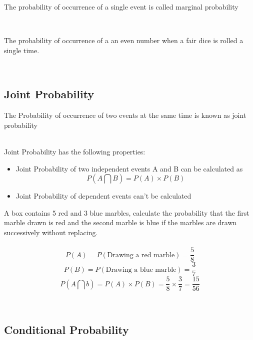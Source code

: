 \documentclass[twoside,12pt]{report}  %
\begin{document}
\begin{tcolorbox}[colback=red!5!white, colframe=red!75!black, title = \textbf{Marginal Probability}]
	The probability of occurrence of a single event is called marginal probability
\end{tcolorbox}
\noindent
\\
\begin{tcolorbox}[colback=blue!5!white, colframe=blue!75!black, title = \textbf{Marginal Probability}]
	The probability of occurrence of a an even number when a fair dice is rolled a single time.
\end{tcolorbox}
\noindent
\\
\subsection{Joint Probability}

\begin{tcolorbox}[colback=red!5!white, colframe=red!75!black, title = \textbf{Joint Probability}]
	The Probability of occurrence of two events at the same time is known as joint probability
\end{tcolorbox}
\noindent
\\
Joint Probability has the following properties:
\begin{itemize}
	\item Joint Probability of two independent events A and B can be calculated as
	$$ P(A \bigcap B) = P(A) \times P(B)$$
	\item Joint Probability of dependent events can't be calculated
\end{itemize}

\begin{tcolorbox}[colback=blue!5!white, colframe=blue!75!black, title = \textbf{Joint Probability}]
	A box contains 5 red and 3 blue marbles, calculate the probability that the first marble drawn is red and the second marble is blue if the marbles are drawn successively without replacing.
	\\
	\\
	 $$ P(A) = P(\mbox{Drawing a red marble}) = \frac{5}{8}$$
	 $$ P(B) = P(\mbox{Drawing a blue marble}) = \frac{3}{7} $$
	 $$ P(A \bigcap b) = P(A) \times P(B) = \frac{5}{8} \times \frac{3}{7} = \frac{15}{56} $$
\end{tcolorbox}
\noindent
\\
\subsection{Conditional Probability}
\end{document}
